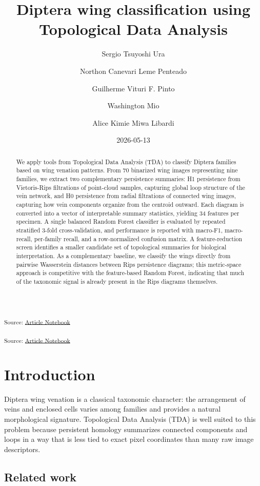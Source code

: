 \documentclass[
  a4paper,
  DIV=11,
  numbers=noendperiod]{scrartcl}
\title{Diptera wing classification using Topological Data Analysis}
\author{Sergio Tsuyoshi Ura \and Northon Canevari Leme
Penteado \and Guilherme Vituri F. Pinto \and Washington Mio \and Alice
Kimie Miwa Libardi}
\date{2026-05-13}
\begin{document}
\maketitle
\begin{abstract}
We apply tools from Topological Data Analysis (TDA) to classify Diptera
families based on wing venation patterns. From 70 binarized wing images
representing nine families, we extract two complementary persistence
summaries: H1 persistence from Vietoris-Rips filtrations of point-cloud
samples, capturing global loop structure of the vein network, and H0
persistence from radial filtrations of connected wing images, capturing
how vein components organize from the centroid outward. Each diagram is
converted into a vector of interpretable summary statistics, yielding 34
features per specimen. A single balanced Random Forest classifier is
evaluated by repeated stratified 3-fold cross-validation, and
performance is reported with macro-F1, macro-recall, per-family recall,
and a row-normalized confusion matrix. A feature-reduction screen
identifies a smaller candidate set of topological summaries for
biological interpretation. As a complementary baseline, we classify the
wings directly from pairwise Wasserstein distances between Rips
persistence diagrams; this metric-space approach is competitive with the
feature-based Random Forest, indicating that much of the taxonomic
signal is already present in the Rips diagrams themselves.
\end{abstract}


\textsubscript{Source:
\href{https://JuliaTDA.github.io/tda-fly/index.qmd.html}{Article
Notebook}}

\textsubscript{Source:
\href{https://JuliaTDA.github.io/tda-fly/index.qmd.html}{Article
Notebook}}

\section{Introduction}\label{introduction}

Diptera wing venation is a classical taxonomic character: the
arrangement of veins and enclosed cells varies among families and
provides a natural morphological signature. Topological Data Analysis
(TDA) is well suited to this problem because persistent homology
summarizes connected components and loops in a way that is less tied to
exact pixel coordinates than many raw image descriptors.

\subsection{Related work}\label{related-work}
\end{document}
